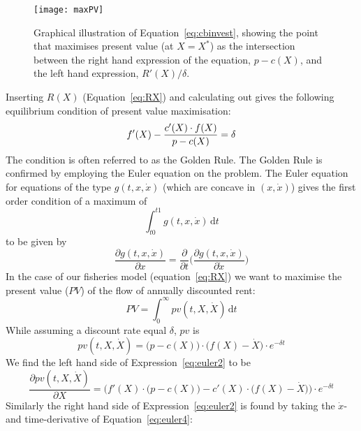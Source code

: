 \documentclass[11pt,fleqn]{book} %
\begin{document}
\begin{figure}[ht]
\centering
\texttt{[image: maxPV]}
\caption{Graphical illustration of Equation~\ref{eq:cbinvest}, showing the point that maximises present value (at $X = X^*$) as the intersection between the right hand expression of the equation, $p - c(X)$, and the left hand expression, $R'(X)/\delta$.}
\label{fig:maxPV}
\end{figure}
\hfill \break
Inserting $R(X)$ (Equation~\ref{eq:RX}) and calculating out gives the following equilibrium condition of present value maximisation:
\begin{equation} \index{Golden Rule}
\label{eq:goldenrule}
 f'(X) - \frac{c'(X) \cdot f(X)}{p - c(X)} = \delta
\end{equation}
The condition is often referred to as the Golden Rule. The Golden Rule is confirmed by employing the Euler equation on the problem. The Euler equation for equations of the type $g(t, x, \dot{x})$ (which are concave in $(x, \dot{x})$) gives the first order condition of a maximum of
\begin{equation*} 
\label{eq:euler1}
 \int_{t0}^{t1} g(t,x,\dot{x})\, \mathrm{d}t
\end{equation*}
to be given by
\begin{equation} 
\label{eq:euler2}
\frac{\partial g(t,x,\dot{x})}{\partial x} = \frac{\partial }{\partial t} \bigg( \frac{\partial g(t,x,\dot{x})}{\partial \dot{x}} \bigg)
\end{equation}
In the case of our fisheries model (equation~\ref{eq:RX}) we want to maximise the present value ($PV$) of the flow of annually discounted rent:
\begin{equation} 
\label{eq:euler3}
PV = \int_{0}^{\infty} pv(t,X,\dot{X}) \, \mathrm{d}t
\end{equation}
While assuming a discount rate equal $\delta$, $pv$ is
\begin{equation} 
\label{eq:euler4}
 pv(t,X,\dot{X}) = \Big(p - c(X) \Big) \cdot \Big(f(X) - \dot{X} \Big) \cdot e^{-\delta t}
\end{equation}
We find the left hand side of Expression~\ref{eq:euler2} to be
\begin{equation} 
\label{eq:euler5}
\frac{\partial pv(t,X,\dot{X})}{\partial X} = \bigg(f'(X) \cdot \Big(p - c(X) \Big) - c'(X) \cdot \Big(f(X) - \dot{X} \Big) \bigg) \cdot e^{-\delta t}
\end{equation}
Similarly the right hand side of Expression~\ref{eq:euler2} is found by taking the $\dot{x}$- and time-derivative of Equation~\ref{eq:euler4}:
\end{document}
